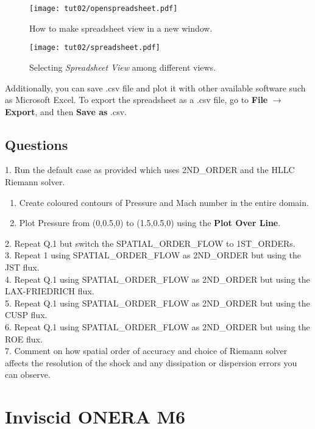 \begin{figure}[htbp]
    \centering
    \texttt{[image: tut02/openspreadsheet.pdf]}
    \caption{How to make spreadsheet view in a new window.}
    \label{fig:open_spreadsheet}
\end{figure}
\begin{figure}[htbp]
    \centering
    \texttt{[image: tut02/spreadsheet.pdf]}
    \caption{Selecting \textit{Spreadsheet View} among different views.}
    \label{fig:spreadsheet}
\end{figure}
Additionally, you can save .csv file and plot it with other available software such as Microsoft Excel. To export the spreadsheet as a .csv file, go to \textbf{File} $\rightarrow$ \textbf{Export}, and then \textbf{Save as} .csv.
\section{Questions}
1. Run the default case as provided which uses 2ND\_ORDER and the HLLC Riemann solver.
\begin{enumerate}[label=(\alph*)]
    \item Create coloured contours of Pressure and Mach number in the entire domain.
    \item Plot Pressure from (0,0.5,0) to (1.5,0.5,0) using the \textbf{Plot Over Line}.
\end{enumerate}
2. Repeat Q.1 but switch the SPATIAL\_ORDER\_FLOW to 1ST\_ORDERs. \\
3. Repeat 1 using SPATIAL\_ORDER\_FLOW as 2ND\_ORDER but using the JST flux. \\
4. Repeat Q.1 using SPATIAL\_ORDER\_FLOW as 2ND\_ORDER but using the LAX-FRIEDRICH flux. \\
5. Repeat Q.1 using SPATIAL\_ORDER\_FLOW as 2ND\_ORDER but using the CUSP flux. \\
6. Repeat Q.1 using SPATIAL\_ORDER\_FLOW as 2ND\_ORDER but using the ROE flux. \\
7. Comment on how spatial order of accuracy and choice of Riemann solver affects the resolution of the shock and any dissipation or dispersion errors you can observe.
\chapter{Inviscid ONERA M6}
